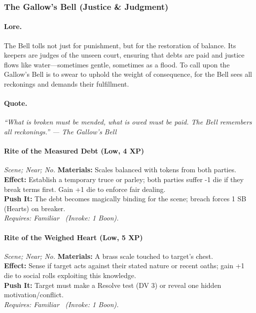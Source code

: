 \subsubsection{The Gallow's Bell (Justice \& Judgment)}

\paragraph{Lore.}
The Bell tolls not just for punishment, but for the restoration of balance. Its keepers are judges of the unseen court, ensuring that debts are paid and justice flows like water—sometimes gentle, sometimes as a flood. To call upon the Gallow's Bell is to swear to uphold the weight of consequence, for the Bell sees all reckonings and demands their fulfillment.

\paragraph{Quote.}
\emph{“What is broken must be mended, what is owed must be paid. The Bell remembers all reckonings.” — The Gallow's Bell}

\paragraph{Rite of the Measured Debt (Low, 4 XP)} \emph{Scene; Near; No.}
\textbf{Materials:} Scales balanced with tokens from both parties. \\
\textbf{Effect:} Establish a temporary truce or parley; both parties suffer -1 die if they break terms first. Gain +1 die to enforce fair dealing. \\
\textbf{Push It:} The debt becomes magically binding for the scene; breach forces 1 SB (Hearts) on breaker. \\
\emph{Requires: Familiar \ (\textit{Invoke:} 1 Boon).}

\paragraph{Rite of the Weighed Heart (Low, 5 XP)} \emph{Scene; Near; No.}
\textbf{Materials:} A brass scale touched to target's chest. \\
\textbf{Effect:} Sense if target acts against their stated nature or recent oaths; gain +1 die to social rolls exploiting this knowledge. \\
\textbf{Push It:} Target must make a Resolve test (DV 3) or reveal one hidden motivation/conflict. \\
\emph{Requires: Familiar \ (\textit{Invoke:} 1 Boon).}

